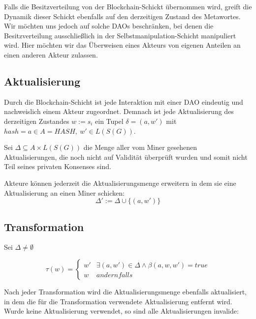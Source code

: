 \documentclass[a4paper,12pt]{report}
\begin{document}
Falls die Besitzverteilung von der Blockchain-Schickt übernommen wird, greift die Dynamik dieser Schickt ebenfalls auf den derzeitigen Zustand des Metawortes. Wir möchten uns jedoch auf solche DAOs beschränken, bei denen die Besitzverteilung ausschließlich in der Selbstmanipulation-Schicht manipuliert wird. Hier möchten wir das Überweisen eines Akteurs von eigenen Anteilen an einen anderen Akteur zulassen.


% 
% 
% 
% 
% 

\subsection*{Aktualisierung}
Durch die Blockchain-Schicht ist jede Interaktion mit einer DAO eindeutig und nachweislich einem Akteur zugeordnet. Demnach ist jede Aktualisierung des derzeitigen Zustandes $w := s_i$ ein Tupel $\delta = (a,w')$ mit $hash=a\in A=HASH,\ w'\in L(S(G))$.

Sei $\Delta \subseteq A\times L(S(G))$ die Menge aller vom Miner gesehenen Aktualisierungen, die noch nicht auf Validität überprüft wurden und somit nicht Teil seines privaten Konsenses sind.


Akteure können jederzeit die Aktualisierungsmenge erweitern in dem sie eine Aktualisierung an einen Miner schicken: 
\[ \Delta' := \Delta \cup \{(a,w')\} \] 


\subsection*{Transformation}
Sei $\Delta \neq \emptyset$ 

\[
  \tau( w ) = 
  \begin{cases}
    w'  & \exists (a,w') \in \Delta \land \beta(a,w,w') = true \\
    w   & andernfalls 
  \end{cases}
\] 

Nach jeder Transformation wird die Aktualisierungsmenge ebenfalls aktualisiert, in dem die für die Transformation verwendete Aktualisierung entfernt wird. Wurde keine Aktualisierung verwendet, so sind alle Aktualisierungen invalide:
\end{document}
